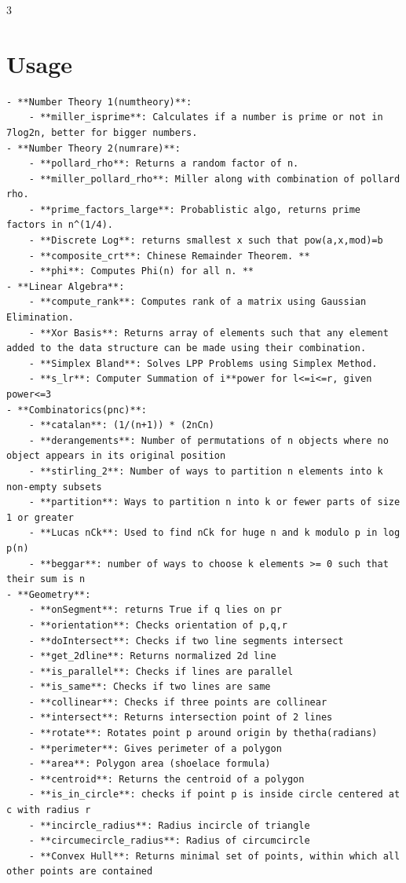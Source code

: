 \documentclass[10pt,landscape, a4paper]{article}
\begin{document}
\begin{multicols*}{3}
\section{Usage}
\begin{lstlisting}[]
- **Number Theory 1(numtheory)**: 
    - **miller_isprime**: Calculates if a number is prime or not in 7log2n, better for bigger numbers.
- **Number Theory 2(numrare)**:
    - **pollard_rho**: Returns a random factor of n.
    - **miller_pollard_rho**: Miller along with combination of pollard rho.
    - **prime_factors_large**: Probablistic algo, returns prime factors in n^(1/4).
    - **Discrete Log**: returns smallest x such that pow(a,x,mod)=b
    - **composite_crt**: Chinese Remainder Theorem. **
    - **phi**: Computes Phi(n) for all n. **
- **Linear Algebra**:
    - **compute_rank**: Computes rank of a matrix using Gaussian Elimination.
    - **Xor Basis**: Returns array of elements such that any element added to the data structure can be made using their combination.
    - **Simplex Bland**: Solves LPP Problems using Simplex Method.
    - **s_lr**: Computer Summation of i**power for l<=i<=r, given power<=3
- **Combinatorics(pnc)**:
    - **catalan**: (1/(n+1)) * (2nCn)
    - **derangements**: Number of permutations of n objects where no object appears in its original position
    - **stirling_2**: Number of ways to partition n elements into k non-empty subsets
    - **partition**: Ways to partition n into k or fewer parts of size 1 or greater
    - **Lucas nCk**: Used to find nCk for huge n and k modulo p in log p(n)
    - **beggar**: number of ways to choose k elements >= 0 such that their sum is n
- **Geometry**:
    - **onSegment**: returns True if q lies on pr
    - **orientation**: Checks orientation of p,q,r
    - **doIntersect**: Checks if two line segments intersect
    - **get_2dline**: Returns normalized 2d line
    - **is_parallel**: Checks if lines are parallel
    - **is_same**: Checks if two lines are same
    - **collinear**: Checks if three points are collinear
    - **intersect**: Returns intersection point of 2 lines
    - **rotate**: Rotates point p around origin by thetha(radians)
    - **perimeter**: Gives perimeter of a polygon
    - **area**: Polygon area (shoelace formula)
    - **centroid**: Returns the centroid of a polygon
    - **is_in_circle**: checks if point p is inside circle centered at c with radius r
    - **incircle_radius**: Radius incircle of triangle
    - **circumecircle_radius**: Radius of circumcircle
    - **Convex Hull**: Returns minimal set of points, within which all other points are contained

\end{lstlisting}
\end{multicols*}
\end{document}
